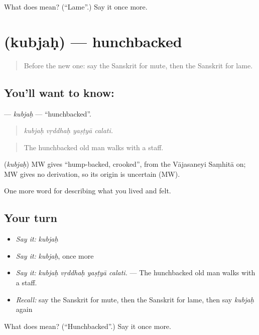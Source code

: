 \begin{tcolorbox}[breakable,colback=teal!4,colframe=teal!35!black,title={Before you move on}]
What does  mean? (\textquotedblleft{}Lame\textquotedblright{}.) Say it once more.
\end{tcolorbox}
\section[\texorpdfstring{\sk{कुब्जः} (kubjaḥ)}{कुब्जः (kubjaḥ)}]{ (kubjaḥ) — hunchbacked}

\label{lesson:SA-C481-kubjah}



\begin{quote}
Before the new one: say the Sanskrit for mute, then the Sanskrit for lame.
\end{quote}

\subsection*{You'll want to know: }
\textbf{} — \emph{kubjaḥ} — \textquotedblleft{}hunchbacked\textquotedblright{}.

\begin{quote}
   
\end{quote}

\begin{quote}
\emph{kubjaḥ vṛddhaḥ yaṣṭyā calati.}
\end{quote}

\begin{quote}
The hunchbacked old man walks with a staff.
\end{quote}

\begin{cousinweb}
\textbf{} (\emph{kubjaḥ}) MW gives \textquotedblleft{}hump-backed, crooked\textquotedblright{}, from the Vājasaneyi Saṃhitā on; MW gives no derivation, so its origin is uncertain (MW).
\end{cousinweb}

\begin{grammarlens}[title={What you've built}]
One more word for describing what you lived and felt.
\end{grammarlens}

\subsection*{Your turn}
\begin{itemize}
\raggedright
  \item \emph{Say it:} \emph{kubjaḥ}
  \item \emph{Say it:} \emph{kubjaḥ}, once more
  \item \emph{Say it:} \emph{kubjaḥ vṛddhaḥ yaṣṭyā calati.} — The hunchbacked old man walks with a staff.
  \item \emph{Recall:} say the Sanskrit for mute, then the Sanskrit for lame, then say \emph{kubjaḥ} again
\end{itemize}

\begin{tcolorbox}[breakable,colback=teal!4,colframe=teal!35!black,title={Before you move on}]
What does  mean? (\textquotedblleft{}Hunchbacked\textquotedblright{}.) Say it once more.
\end{tcolorbox}
